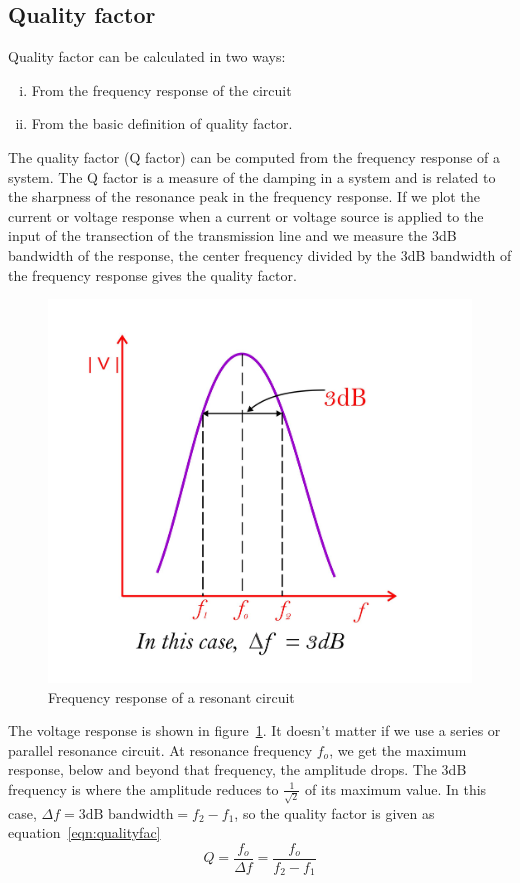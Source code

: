 \subsection{Quality factor}
Quality factor can be calculated in two ways:
\begin{enumerate}[(i)]
\item From the frequency response of the circuit
\item From the basic definition of quality factor.
\end{enumerate}
The quality factor (Q factor) can be computed from the frequency response of a system. The Q factor is a measure of the damping in a system and is related to the sharpness of the resonance peak in the frequency response. If we plot the current or voltage response when a current or voltage source is applied to the input of the transection of the transmission line and we measure the 3dB bandwidth of the response, the center frequency divided by the 3dB bandwidth of the frequency response gives the quality factor.
\begin{figure}[h]
\centering
\includegraphics[width=0.8\linewidth]{./graphics/fig2}
\caption{Frequency response of a resonant circuit}
\label{fig:fig2}
\end{figure}

The voltage response is shown in figure~\ref{fig:fig2}. It doesn't matter if we use a series or parallel resonance circuit. At resonance frequency $ f_{o} $, we get the maximum response, below and beyond that frequency, the amplitude drops. The 3dB frequency is where the amplitude reduces to $ \frac{1}{\sqrt{2}} $ of its maximum value. In this case, $ \Delta f=3\text{dB bandwidth} =f_{2}-f_{1} $, so the quality factor is given as equation~\eqref{eqn:qualityfac}
\begin{equation}
Q=\frac{f_{o}}{\Delta f}=\frac{f_{o}}{f_{2}-f_{1}}
\label{eqn:qualityfac}
\end{equation} 


